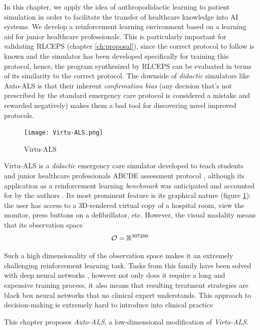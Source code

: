 In this chapter, we apply the idea of anthropodidactic learning to patient simulation in order to facilitate the transfer of healthcare knowledge into AI systems.
We develop a reinforcement learning environment based on a learning aid for junior healthcare professionals.
This is particularly important for validating RLCEPS (chapter \ref{ch:proposal}), since the correct protocol to follow is known and the simulator has been developed specifically for training this protocol, hence, the program synthesized by RLCEPS can be evaluated in terms of its similarity to the correct protocol.
The downside of \emph{didactic} simulators like Auto-ALS is that their inherent \emph{confirmation bias} (any decision that's not prescribed by the standard emergency care protocol is considered a mistake and rewarded negatively) makes them a bad tool for discovering novel improved protocols.

\begin{figure}
    \centering
    \texttt{[image: Virtu-ALS.png]}
    \caption{Virtu-ALS}
    \label{fig:virtu-als}
\end{figure}

Virtu-ALS is a \emph{didactic} emergency care simulator developed to teach students and junior healthcare professionals ABCDE assessment protocol \cite{thimInitialAssessmentTreatment2012}, although its application as a reinforcement learning \emph{benchmark} was anticipated and accounted for by the authors \cite{briskAIEnhanceInteractive2018}.
Its most prominent feature is its graphical nature (figure \ref{fig:virtu-als}): the user has access to a 3D-rendered virtual copy of a hospital room, view the monitor, press buttons on a defibrillator, etc.
However, the visual modality means that its observation space 
\begin{equation}
    \mathcal{O} = \mathbb{R}^{307200}
\end{equation}

Such a high dimensionality of the observation space makes it an extremely challenging reinforcement learning task.
Tasks from this family have been solved with deep neural networks \cite{mnihPlayingAtariDeep2013}, however not only does it require a long and expensive training process, it also means that resulting treatment strategies are black box neural networks that no clinical expert understands.
This approach to decision-making is extremely hard to introduce into clinical practice \cite{priceBigDataBlackbox2018,watsonClinicalApplicationsMachine2019}

This chapter proposes \emph{Auto-ALS}, a low-dimensional modification of \emph{Virtu-ALS}.

